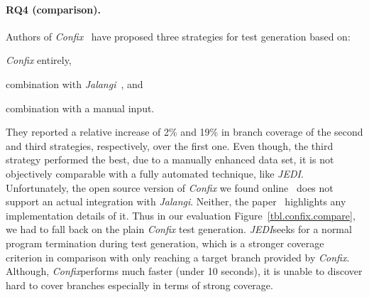 \documentclass[sigconf,review]{acmart}
\newcommand{\Confix}{\emph{Confix}}
\newcommand{\Jedi}{\emph{JEDI}}
\begin{document}
\paragraph{\textbf{RQ4 (comparison).}} Authors of \emph{Confix}~\cite{amin:ase15} have proposed three strategies for test generation based on: 
\begin{enumerate*}[label=(\roman*)]
  \item \emph{Confix} entirely,
  \item combination with \emph{Jalangi}~\cite{sen2013jalangi}, and
  \item combination with a manual input. 
\end{enumerate*}
They reported a relative increase of 2\% and 19\% in branch coverage of the second and third strategies, respectively, over the first one. Even though, the third strategy performed the best, due to a manually enhanced data set, it is not objectively comparable with a fully automated technique, like \emph{JEDI}. Unfortunately, the open source version of \emph{Confix} we found online~\cite{confixgit} does not support an actual integration with \emph{Jalangi}. Neither, the paper~\cite{amin:ase15} highlights any implementation details of it. Thus in our evaluation Figure~\ref{tbl.confix.compare}, we had to fall back on the plain \emph{Confix} test generation. \Jedi seeks for a normal program termination during test generation, which is a stronger coverage criterion in comparison with only reaching a target branch provided by \Confix. Although, \Confix performs much faster (under 10 seconds), it is unable to discover hard to cover branches especially in terms of strong coverage.
\end{document}
